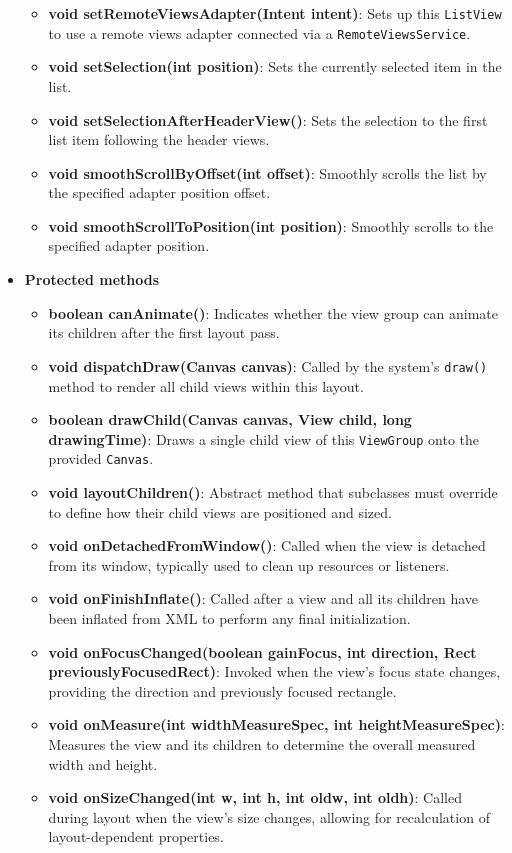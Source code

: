 \documentclass{report}
\begin{document}
\begin{itemize}
\begin{itemize}
                \item \textbf{void setRemoteViewsAdapter(Intent intent)}: Sets up this \texttt{ListView} to use a remote views adapter connected via a \texttt{RemoteViewsService}.
                \item \textbf{void setSelection(int position)}: Sets the currently selected item in the list.
                \item \textbf{void setSelectionAfterHeaderView()}: Sets the selection to the first list item following the header views.
                \item \textbf{void smoothScrollByOffset(int offset)}: Smoothly scrolls the list by the specified adapter position offset.
                \item \textbf{void smoothScrollToPosition(int position)}: Smoothly scrolls to the specified adapter position.
            \end{itemize}

        \item \textbf{Protected methods}
            \begin{itemize}
                \item \textbf{boolean canAnimate()}: Indicates whether the view group can animate its children after the first layout pass.
                \item \textbf{void dispatchDraw(Canvas canvas)}: Called by the system’s \texttt{draw()} method to render all child views within this layout.
                \item \textbf{boolean drawChild(Canvas canvas, View child, long drawingTime)}: Draws a single child view of this \texttt{ViewGroup} onto the provided \texttt{Canvas}.
                \item \textbf{void layoutChildren()}: Abstract method that subclasses must override to define how their child views are positioned and sized.
                \item \textbf{void onDetachedFromWindow()}: Called when the view is detached from its window, typically used to clean up resources or listeners.
                \item \textbf{void onFinishInflate()}: Called after a view and all its children have been inflated from XML to perform any final initialization.
                \item \textbf{void onFocusChanged(boolean gainFocus, int direction, Rect previouslyFocusedRect)}: Invoked when the view’s focus state changes, providing the direction and previously focused rectangle.
                \item \textbf{void onMeasure(int widthMeasureSpec, int heightMeasureSpec)}: Measures the view and its children to determine the overall measured width and height.
                \item \textbf{void onSizeChanged(int w, int h, int oldw, int oldh)}: Called during layout when the view’s size changes, allowing for recalculation of layout-dependent properties.
            \end{itemize}


    \end{itemize}
\end{document}
